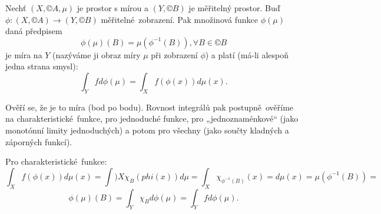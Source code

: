 \documentclass[12pt]{article}					%
\begin{document}
\begin{veta}
	Nechť $(X, ©A, \mu)$ je prostor s mírou a $(Y, ©B)$ je měřitelný prostor. Buď $\phi: (X, ©A) \rightarrow (Y, ©B)$ měřitelné zobrazení. Pak množinová funkce $\phi(\mu)$ daná předpisem
	$$ \phi(\mu)(B) = \mu(\phi^{-1}(B)), \forall B \in ©B $$
	je míra na $Y$ (nazýváme ji obraz míry $\mu$ při zobrazení $\phi$) a platí (má-li alespoň jedna strana smysl):
	$$ \int_Y f d\phi(\mu) = \int_X f(\phi(x)) d\mu(x). $$

	\begin{dukazin}
		Ověří se, že je to míra (bod po bodu). Rovnost integrálů pak postupně ověříme na charakteristické funkce, pro jednoduché funkce, pro „jednoznaménkové“ (jako monotónní limity jednoduchých) a potom pro všechny (jako součty kladných a záporných funkcí).

		Pro charakteristické funkce:
		$$ \int_X f(\phi(x)) d\mu(x) = \int)X \chi_B(phi(x)) d\mu = \int_X \chi_{\phi^{-1}(B)}(x) = d\mu(x) = \mu(\phi^{-1}(B)) = $$
		$$ \phi(\mu)(B) = \int_Y \chi_B d\phi(\mu) = \int_Y f d\phi(\mu). $$
	\end{dukazin}
\end{veta}
\end{document}
